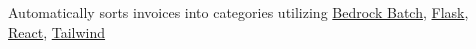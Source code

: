{Automatically sorts invoices into categories utilizing \href{https://docs.aws.amazon.com/bedrock/latest/userguide/batch-inference.html}{Bedrock Batch}, \href{https://github.com/pallets/flask}{Flask}, \href{https://react.dev/}{React}, \href{https://tailwindcss.com/}{Tailwind}}
